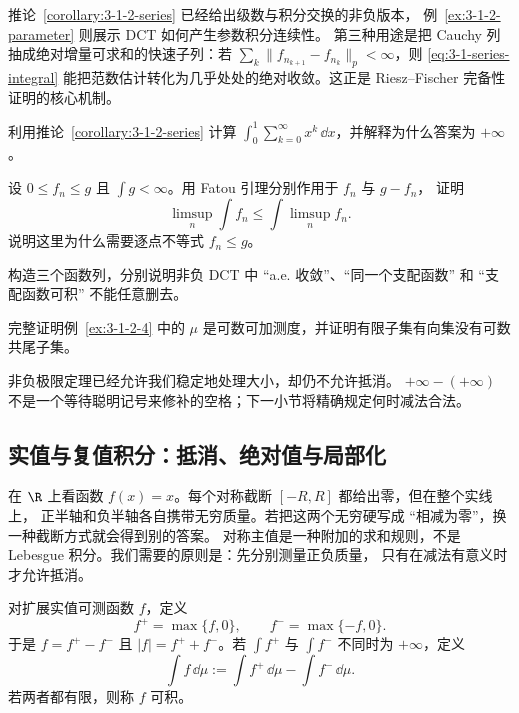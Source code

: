 \begin{remark}[三个直接用途]
推论~\ref{corollary:3-1-2-series} 已经给出级数与积分交换的非负版本，
例~\ref{ex:3-1-2-parameter} 则展示 DCT 如何产生参数积分连续性。
第三种用途是把 Cauchy 列抽成绝对增量可求和的快速子列：若
$\sum_k\|f_{n_{k+1}}-f_{n_k}\|_p<\infty$，则
\eqref{eq:3-1-series-integral} 能把范数估计转化为几乎处处的绝对收敛。这正是
Riesz--Fischer 完备性证明的核心机制。
\end{remark}

\begin{exercise}
利用推论~\ref{corollary:3-1-2-series} 计算
$\int_0^1\sum_{k=0}^\infty x^k\,\dd x$，并解释为什么答案为 $+\infty$。
\end{exercise}

\begin{exercise}
设 $0\leq f_n\leq g$ 且 $\int g<\infty$。用 Fatou 引理分别作用于 $f_n$ 与 $g-f_n$，
证明
\[
 \limsup_n\int f_n\leq\int\limsup_nf_n.
\]
说明这里为什么需要逐点不等式 $f_n\leq g$。
\end{exercise}

\begin{exercise}
构造三个函数列，分别说明非负 DCT 中 ``a.e. 收敛''、``同一个支配函数'' 和
``支配函数可积'' 不能任意删去。
\end{exercise}

\begin{exercise}
完整证明例~\ref{ex:3-1-2-4} 中的 $\mu$ 是可数可加测度，并证明有限子集有向集没有可数共尾子集。
\end{exercise}

非负极限定理已经允许我们稳定地处理大小，却仍不允许抵消。
$+\infty-(+\infty)$ 不是一个等待聪明记号来修补的空格；下一小节将精确规定何时减法合法。

\subsection{实值与复值积分：抵消、绝对值与局部化}\label{subsec:3-1-3}

在 $\R$ 上看函数 $f(x)=x$。每个对称截断 $[-R,R]$ 都给出零，但在整个实线上，
正半轴和负半轴各自携带无穷质量。若把这两个无穷硬写成 ``相减为零''，换一种截断方式就会得到别的答案。
对称主值是一种附加的求和规则，不是 Lebesgue 积分。我们需要的原则是：先分别测量正负质量，
只有在减法有意义时才允许抵消。

\begin{definition}[正负部分]\label{def:3-1-3-1}
对扩展实值可测函数 $f$，定义
\[
 f^+=\max\{f,0\},\qquad f^-=\max\{-f,0\}.
\]
于是 $f=f^+-f^-$ 且 $|f|=f^++f^-$。若 $\int f^+$ 与 $\int f^-$ 不同时为
$+\infty$，定义
\[
 \int f\,\dd\mu:=\int f^+\,\dd\mu-\int f^-\,\dd\mu.
 \tag{3.1.15}\label{eq:3-1-signed-integral}
\]
若两者都有限，则称 $f$ 可积。
\end{definition}

